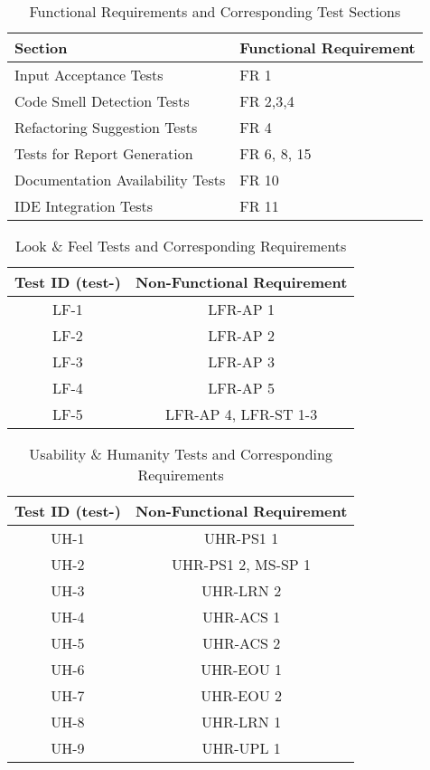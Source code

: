 \documentclass[12pt, titlepage]{article}
\begin{document}
  \begin{table}[H]
    \centering
    \caption{Functional Requirements and Corresponding Test Sections}
    \begin{tabular}{p{}p{}}
      \toprule \textbf{Section} & \textbf{Functional Requirement} \\

      \midrule
      Input Acceptance Tests & FR 1 \\
      Code Smell Detection Tests & FR 2,3,4 \\
      Refactoring Suggestion Tests & FR 4 \\
      Tests for Report Generation & FR 6, 8, 15 \\
      Documentation Availability Tests & FR 10 \\
      IDE Integration Tests & FR 11 \\
      \bottomrule
    \end{tabular}
    \label{tab:sections_requirements}
  \end{table}

  \label{tab:nfr-trace-reqs}
  \begin{table}[H]
    \centering
    \caption{Look \& Feel Tests and Corresponding Requirements}
    \begin{tabular}{cc}
      \toprule \textbf{Test ID (test-)} & \textbf{Non-Functional Requirement} \\
      \midrule
      LF-1 & LFR-AP 1 \\
      LF-2 & LFR-AP 2 \\
      LF-3 & LFR-AP 3 \\
      LF-4 & LFR-AP 5 \\
      LF-5 & LFR-AP 4, LFR-ST 1-3 \\
      \bottomrule
    \end{tabular}
  \end{table}

  \begin{table}[H]
    \centering
    \caption{Usability \& Humanity Tests and Corresponding Requirements}
    \begin{tabular}{cc}
      \toprule \textbf{Test ID (test-)} & \textbf{Non-Functional Requirement} \\
      \midrule
      UH-1 & UHR-PS1 1 \\
      UH-2 & UHR-PS1 2, MS-SP 1 \\
      UH-3 & UHR-LRN 2 \\
      UH-4 & UHR-ACS 1 \\
      UH-5 & UHR-ACS 2 \\
      UH-6 & UHR-EOU 1 \\
      UH-7 & UHR-EOU 2 \\
      UH-8 & UHR-LRN 1 \\
      UH-9 & UHR-UPL 1 \\
      \bottomrule
    \end{tabular}
  \end{table}
\end{document}
